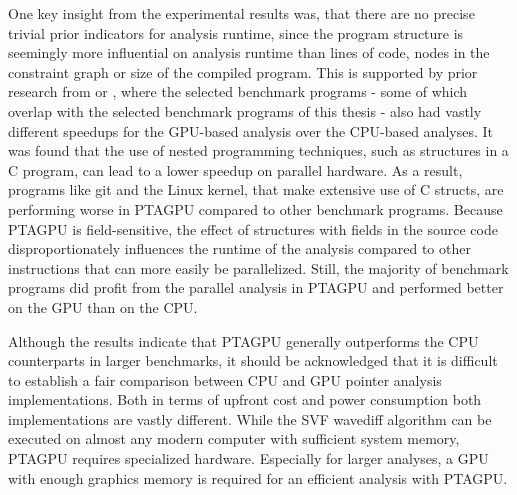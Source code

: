 One key insight from the experimental results was, that there are no precise trivial prior indicators for analysis runtime, since the program structure is seemingly more influential on analysis runtime than lines of code, nodes in the constraint graph or size of the compiled program.
This is supported by prior research from \cite{mendez2012gpu} or \cite{su2015efficient}, where the selected benchmark programs - some of which overlap with the selected benchmark programs of this thesis - also had vastly different speedups for the GPU-based analysis over the CPU-based analyses.
It was found that the use of nested programming techniques, such as structures in a C program, can lead to a lower speedup on parallel hardware.
As a result, programs like git and the Linux kernel, that make extensive use of C structs, are performing worse in PTAGPU compared to other benchmark programs.
Because PTAGPU is field-sensitive, the effect of structures with fields in the source code disproportionately influences the runtime of the analysis compared to other instructions that can more easily be parallelized.
Still, the majority of benchmark programs did profit from the parallel analysis in PTAGPU and performed better on the GPU than on the CPU.

Although the results indicate that PTAGPU generally outperforms the CPU counterparts in larger benchmarks, it should be acknowledged that it is difficult to establish a fair comparison between CPU and GPU pointer analysis implementations.
Both in terms of upfront cost and power consumption both implementations are vastly different. While the SVF wavediff algorithm can be executed on almost any modern computer with sufficient system memory, PTAGPU requires specialized hardware. Especially for larger analyses, a GPU with enough graphics memory is required for an efficient analysis with PTAGPU.

